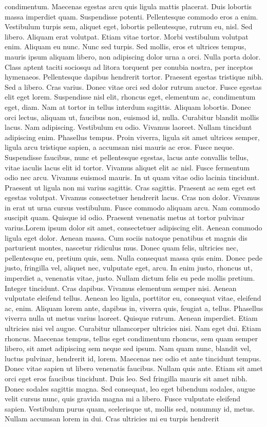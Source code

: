 condimentum. Maecenas egestas arcu quis ligula mattis placerat. Duis lobortis massa imperdiet quam. Suspendisse potenti. Pellentesque commodo eros a enim. Vestibulum turpis sem, aliquet eget, lobortis pellentesque, rutrum eu, nisl. Sed libero. Aliquam erat volutpat. Etiam vitae tortor. Morbi vestibulum volutpat enim. Aliquam eu nunc. Nunc sed turpis. Sed mollis, eros et ultrices tempus, mauris ipsum aliquam libero, non adipiscing dolor urna a orci. Nulla porta dolor. Class aptent taciti sociosqu ad litora torquent per conubia nostra, per inceptos hymenaeos. Pellentesque dapibus hendrerit tortor. Praesent egestas tristique nibh. Sed a libero. Cras varius. Donec vitae orci sed dolor rutrum auctor. Fusce egestas elit eget lorem. Suspendisse nisl elit, rhoncus eget, elementum ac, condimentum eget, diam. Nam at tortor in tellus interdum sagittis. Aliquam lobortis. Donec orci lectus, aliquam ut, faucibus non, euismod id, nulla. Curabitur blandit mollis lacus. Nam adipiscing. Vestibulum eu odio. Vivamus laoreet. Nullam tincidunt adipiscing enim. Phasellus tempus. Proin viverra, ligula sit amet ultrices semper, ligula arcu tristique sapien, a accumsan nisi mauris ac eros. Fusce neque. Suspendisse faucibus, nunc et pellentesque egestas, lacus ante convallis tellus, vitae iaculis lacus elit id tortor. Vivamus aliquet elit ac nisl. Fusce fermentum odio nec arcu. Vivamus euismod mauris. In ut quam vitae odio lacinia tincidunt. Praesent ut ligula non mi varius sagittis. Cras sagittis. Praesent ac sem eget est egestas volutpat. Vivamus consectetuer hendrerit lacus. Cras non dolor. Vivamus in erat ut urna cursus vestibulum. Fusce commodo aliquam arcu. Nam commodo suscipit quam. Quisque id odio. Praesent venenatis metus at tortor pulvinar varius.Lorem ipsum dolor sit amet, consectetuer adipiscing elit. Aenean commodo ligula eget dolor. Aenean massa. Cum sociis natoque penatibus et magnis dis parturient montes, nascetur ridiculus mus. Donec quam felis, ultricies nec, pellentesque eu, pretium quis, sem. Nulla consequat massa quis enim. Donec pede justo, fringilla vel, aliquet nec, vulputate eget, arcu. In enim justo, rhoncus ut, imperdiet a, venenatis vitae, justo. Nullam dictum felis eu pede mollis pretium. Integer tincidunt. Cras dapibus. Vivamus elementum semper nisi. Aenean vulputate eleifend tellus. Aenean leo ligula, porttitor eu, consequat vitae, eleifend ac, enim. Aliquam lorem ante, dapibus in, viverra quis, feugiat a, tellus. Phasellus viverra nulla ut metus varius laoreet. Quisque rutrum. Aenean imperdiet. Etiam ultricies nisi vel augue. Curabitur ullamcorper ultricies nisi. Nam eget dui. Etiam rhoncus. Maecenas tempus, tellus eget condimentum rhoncus, sem quam semper libero, sit amet adipiscing sem neque sed ipsum. Nam quam nunc, blandit vel, luctus pulvinar, hendrerit id, lorem. Maecenas nec odio et ante tincidunt tempus. Donec vitae sapien ut libero venenatis faucibus. Nullam quis ante. Etiam sit amet orci eget eros faucibus tincidunt. Duis leo. Sed fringilla mauris sit amet nibh. Donec sodales sagittis magna. Sed consequat, leo eget bibendum sodales, augue velit cursus nunc, quis gravida magna mi a libero. Fusce vulputate eleifend sapien. Vestibulum purus quam, scelerisque ut, mollis sed, nonummy id, metus. Nullam accumsan lorem in dui. Cras ultricies mi eu turpis hendrerit 